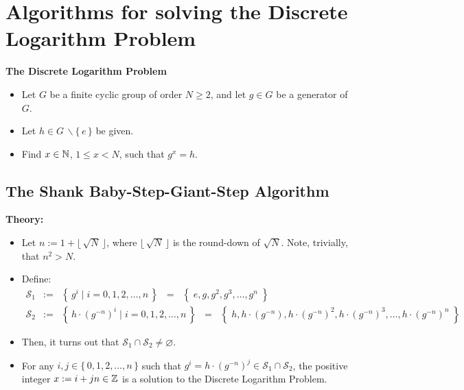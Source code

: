 
\section{Algorithms for solving the Discrete Logarithm Problem}
\setcounter{theorem}{0}
\setcounter{equation}{0}

\vskip 1.0cm
\begin{center}
\begin{minipage}{0.80\textwidth}
	\begin{center}\textbf{The Discrete Logarithm Problem}\end{center}
	\begin{itemize}
	\item	Let $G$ be a finite cyclic group of order $N \geq 2$, and let $g \in G$ be a generator of $G$.
	\item	Let $h \in G\,\backslash \{\,e\,\}$ be given.
	\item	Find $x \in \mathbb{N}$, $1 \leq x < N$, such that $g^{x} = h$.
	\end{itemize}
\end{minipage}
\end{center}
\vskip 1.0cm

\subsection{The Shank Baby-Step-Giant-Step Algorithm}

\noindent
\textbf{Theory:}
\begin{itemize}
\item	Let $n := 1 + \lfloor\,\sqrt{N}\,\rfloor$, where $\lfloor\,\sqrt{N}\,\rfloor$ is the round-down of $\sqrt{N}$.
		Note, trivially, that $n^{2} > N$.
\item	Define:
		\begin{eqnarray*}
		\mathcal{S}_{1} & := & \left\{\,g^{i}\;\vert\;i = 0,1,2,\ldots,n\,\right\}\;\;=\;\;\left\{\;e, g, g^{2}, g^{3}, \ldots, g^{n}\;\right\} \\
		\mathcal{S}_{2} & := & \left\{\,h\cdot(g^{-n})^{i}\;\vert\;i = 0,1,2,\ldots,n\,\right\}\;\;=\;\;\left\{\;h, h\cdot(g^{-n}), h\cdot(g^{-n})^{2}, h\cdot(g^{-n})^{3}, \ldots, h\cdot(g^{-n})^{n}\;\right\}
		\end{eqnarray*}
\item	Then, it turns out that $\mathcal{S}_{1}\cap\mathcal{S}_{2} \neq \varnothing$.
\item	For any $i, j \in \{\,0,1,2,\ldots,n\,\}$ such that $g^{i} = h\cdot(g^{-n})^{j} \in \mathcal{S}_{1}\cap\mathcal{S}_{2}$,
		the positive integer $x := i + jn \in \mathbb{Z}$ is a solution to the Discrete Logarithm Problem.
\end{itemize}

